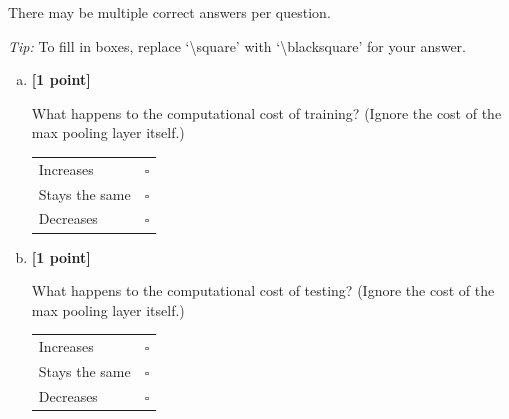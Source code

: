There may be multiple correct answers per question.

\emph{Tip:} To fill in boxes, replace `\textbackslash square' with `\textbackslash blacksquare' for your answer.



\begin{enumerate}[(a)]
    \item \textbf{[1 point]}
    \begin{tcolorbox}[colback=orange!5!white,colframe=orange!75!black]
    What happens to the computational cost of training? (Ignore the cost of the max pooling layer itself.)
    \end{tcolorbox}
    \begin{tcolorbox}[colback=white!5!white,colframe=green!75!black]
    
    \begin{tabular}[h]{lr}
    \toprule
    Increases & $\square$ \\
    Stays the same & $\square$ \\
    Decreases & $\square$ \\
    \bottomrule
    \end{tabular}
    \end{tcolorbox}
    
    \item \textbf{[1 point]}
    \begin{tcolorbox}[colback=orange!5!white,colframe=orange!75!black]
    What happens to the computational cost of testing? (Ignore the cost of the max pooling layer itself.)
    \end{tcolorbox}
    \begin{tcolorbox}[colback=white!5!white,colframe=green!75!black]

    \begin{tabular}[h]{lr}
    \toprule
    Increases & $\square$ \\
    Stays the same & $\square$ \\
    Decreases & $\square$ \\
    \bottomrule
    \end{tabular}
    \end{tcolorbox}


\end{enumerate}
